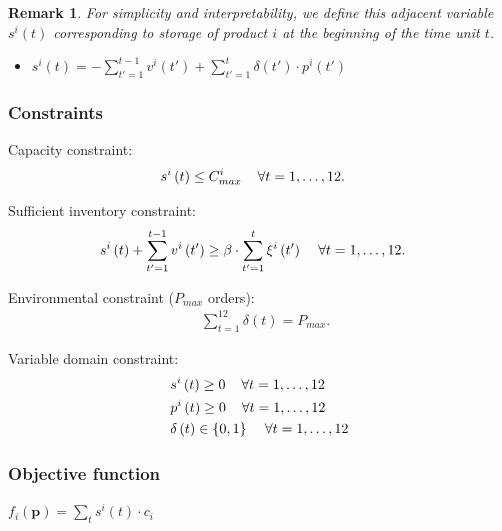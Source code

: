 \documentclass[11pt,twocolumn]{article}
\newtheorem{remark}{Remark}{}
\begin{document}
\begin{remark}
	For simplicity and interpretability, we define this adjacent variable $s^{i}\left( t \right) $ corresponding to storage of product $i$ at the beginning of the time unit $t$.
\end{remark}

\begin{itemize}
	\item $s^{i}\left( t \right) = - \sum_{t'=1}^{t-1} v^{i}\left( t' \right)  + \sum_{t'=1}^{t} \delta\left( t' \right) \cdot p^{i}\left( t' \right)  $
\end{itemize}

\subsubsection{Constraints}

Capacity constraint:
\begin{align*}
	 & s^{i}\left( t \right) \le C^{i}_{max} \hspace{4mm} \forall t = 1,\ldots,12
	.\end{align*}

Sufficient inventory constraint:
\begin{align*}
	 & s^{i}\left( t \right) + \sum_{t'=1}^{t-1} v^{i}\left( t' \right) \ge \beta\cdot \sum_{t'=1}^{t} \xi^{i}\left( t' \right) \hspace{4mm} \forall t = 1,\ldots,12
	.\end{align*}


Environmental constraint ($P_{max}$ orders):
\begin{align*}
	 & \sum_{t=1}^{12} \delta\left( t \right) = P_{max}
	.\end{align*}

Variable domain constraint:
\begin{align*}
	 & s^{i}\left( t \right) \ge 0 \hspace{4mm} \forall t = 1,\ldots,12                       \\
	 & p^{i}\left( t \right) \ge 0 \hspace{4mm} \forall t = 1,\ldots,12                       \\
	 & \delta \left( t \right) \in  \left\{ 0,1 \right\} \hspace{4mm} \forall t = 1,\ldots,12
\end{align*}

\subsubsection{Objective function}
\hspace{4mm} $ f_i(\mathbf{p}) = \sum_{t}^{} s^{i}\left( t \right) \cdot c_i$
\end{document}
